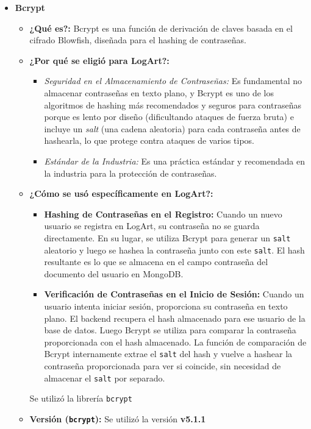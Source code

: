 \begin{itemize}
        \item  \textbf{Bcrypt}
            \begin{itemize}
                \item \textbf{¿Qué es?:} Bcrypt es una función de derivación de claves basada en el cifrado Blowfish, diseñada para el hashing de contraseñas. \cite{webempresaBcrypt}
                \item \textbf{¿Por qué se eligió para LogArt?:}
                    \begin{itemize}
                        \item \textit{Seguridad en el Almacenamiento de Contraseñas:} Es fundamental no almacenar contraseñas en texto plano, y Bcrypt es uno de los algoritmos de hashing más recomendados y seguros para contraseñas porque es lento por diseño (dificultando ataques de fuerza bruta) e incluye un \textit{salt} (una cadena aleatoria) para cada contraseña antes de hashearla, lo que protege contra ataques de varios tipos.
                        \item \textit{Estándar de la Industria:} Es una práctica estándar y recomendada en la industria para la protección de contraseñas.
                    \end{itemize}
            \item \textbf{¿Cómo se usó específicamente en LogArt?:}
                \begin{itemize}
                    \item \textbf{Hashing de Contraseñas en el Registro:} Cuando un nuevo usuario se registra en LogArt, su contraseña no se guarda directamente. En su lugar, se utiliza Bcrypt para generar un \texttt{salt} aleatorio y luego se hashea la contraseña junto con este \texttt{salt}. El hash resultante es lo que se almacena en el campo contraseña del documento del usuario en MongoDB.
                    \item \textbf{Verificación de Contraseñas en el Inicio de Sesión:} Cuando un usuario intenta iniciar sesión, proporciona su contraseña en texto plano. El backend recupera el hash almacenado para ese usuario de la base de datos. Luego Bcrypt se utiliza para comparar la contraseña proporcionada con el hash almacenado. La función de comparación de Bcrypt internamente extrae el \texttt{salt} del hash y vuelve a hashear la contraseña proporcionada para ver si coincide, sin necesidad de almacenar el \texttt{salt} por separado.
                \end{itemize}
            Se utilizó la librería \texttt{bcrypt}
            \item \textbf{Versión (\texttt{bcrypt}):} Se utilizó la versión \textbf{v5.1.1}
            \end{itemize}
\end{itemize}

